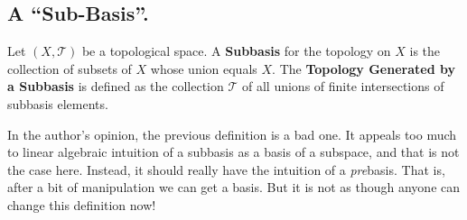 \subsection{A ``Sub-Basis''.}
\begin{defn}\label{defn:subbasis}
Let $(X,\mathcal{T})$ be a topological space. A \textbf{Subbasis}
for the topology on $X$ is the collection of subsets of $X$ whose
union equals $X$. The \textbf{Topology Generated by a Subbasis} is
defined as the collection $\mathcal{T}$ of all unions of finite
intersections of subbasis elements.
\end{defn}
\begin{rmk}\label{rmk:subbasisAsBadDefn}
In the author's opinion, the previous definition is a bad one. It
appeals too much to linear algebraic intuition of a subbasis as a
basis of a subspace, and that is not the case here. Instead, it
should really have the intuition of a \emph{pre}basis. That is,
after a bit of manipulation we can get a basis. But it is not as
though anyone can change this definition now!
\end{rmk}
